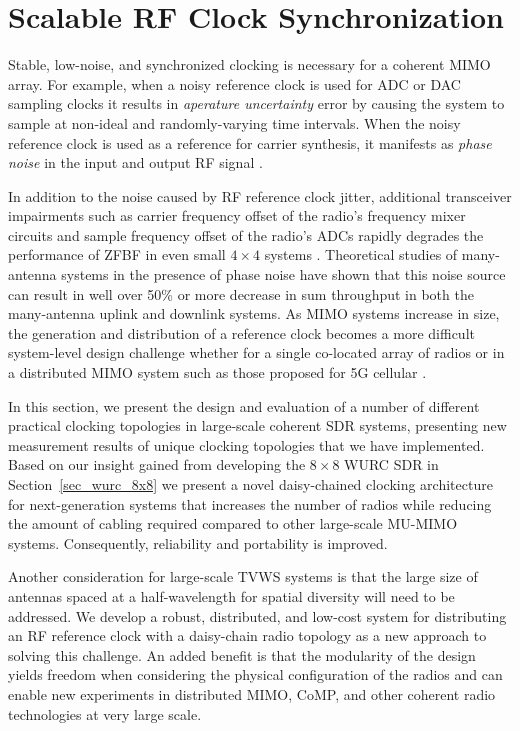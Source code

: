 \section{Scalable RF Clock Synchronization}
\label{sec_iris_clocking}

	Stable, low-noise, and synchronized clocking is necessary for a coherent \ac{MIMO} array.
	For example, when a noisy reference clock is used for \ac{ADC} or \ac{DAC} sampling clocks it results in \textit{aperature uncertainty} error \cite{brannon2006jitter} by causing the system to sample at non-ideal and randomly-varying time intervals.
	When the noisy reference clock is used as a reference for carrier synthesis, it manifests as \textit{phase noise} in the input and output RF signal \cite{an687}.
	
	In addition to the noise caused by RF reference clock jitter, additional transceiver impairments such as carrier frequency offset of the radio's frequency mixer circuits and sample frequency offset of the radio's \acp{ADC} rapidly degrades the performance of \ac{ZFBF} in even small $4\times 4$ systems \cite{rogalin2014scalable}.
		Theoretical studies of many-antenna systems in the presence of phase noise have shown that this noise source can result in well over 50\% or more decrease in sum throughput in both the many-antenna uplink \cite{krishnan2014impact} and downlink \cite{pitarokoilis2012effect} systems.
	As \ac{MIMO} systems increase in size, the generation and distribution of a reference clock becomes a more difficult system-level design challenge whether for a single co-located array of radios or in a distributed \ac{MIMO} system such as those proposed for 5G cellular \cite{cui2014evolution, ali2014evolution}.
	
	In this section, we present the design and evaluation of a number of different practical clocking topologies in large-scale coherent \ac{SDR} systems, presenting new measurement results of unique clocking topologies that we have implemented.
	Based on our insight gained from developing the $8\times 8$ \ac{WURC} \ac{SDR} in Section~\ref{sec_wurc_8x8} we present a novel daisy-chained clocking architecture for next-generation systems that increases the number of radios while reducing the amount of cabling required compared to other large-scale \ac{MU-MIMO} systems.
	Consequently, reliability and portability is improved.
	
	Another consideration for large-scale \ac{TVWS} systems is that the large size of antennas spaced at a half-wavelength for spatial diversity will need to be addressed.
	We develop a robust, distributed, and low-cost system for distributing an RF reference clock with a daisy-chain radio topology as a new approach to solving this challenge.
	An added benefit is that the modularity of the design yields freedom when considering the physical configuration of the radios and can enable new experiments in distributed \ac{MIMO}, \ac{CoMP}, and other coherent radio technologies at very large scale.

